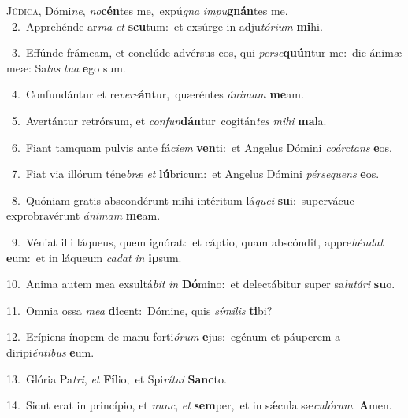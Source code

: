 \lettrine{\initial\textcolor{\initialcolor}{J}}{údica,} Dómi\-\textit{ne}\-, \textit{no}\-\textbf{cén}tes me,~\star expú\textit{gna} \textit{im}\-\textit{pu}\textbf{gnán}tes me.\\
{\numbfont\textcolor{\numbcolor}{~2.}}~Apprehénde ar\textit{ma} \textit{et} \textbf{scu}\-tum:~\star et exsúrge in adju\-\textit{tó}\-\textit{ri}\textit{um} \textbf{mi}\-hi.\par
{\numbfont\textcolor{\numbcolor}{~3.}}~Effúnde frámeam, et conclúde advérsus eos, qui \textit{per}\-\textit{se}\textbf{quún}tur me:~\star dic ánimæ meæ: Sa\textit{lus} \textit{tu}\-\textit{a} \textbf{e}\-go sum.\par
{\numbfont\textcolor{\numbcolor}{~4.}}~Confundántur et re\-\textit{ve}\-\textit{re}\textbf{án}tur,~\star quæréntes \textit{á}\-\textit{ni}\textit{mam} \textbf{me}\-am.\par
{\numbfont\textcolor{\numbcolor}{~5.}}~Avertántur retrórsum, et \textit{con}\-\textit{fun}\textbf{dán}tur~\star cogitán\textit{tes} \textit{mi}\-\textit{hi} \textbf{ma}\-la.\par
{\numbfont\textcolor{\numbcolor}{~6.}}~Fiant tamquam pulvis ante fá\-\textit{ci}\-\textit{em} \textbf{ven}\-ti:~\star et Angelus Dómini \textit{co}\-\textit{árc}\textit{tans} \textbf{e}\-os.\par
{\numbfont\textcolor{\numbcolor}{~7.}}~Fiat via illórum téne\textit{bræ} \textit{et} \textbf{lú}\-bricum:~\star et Angelus Dómini \textit{pér}\-\textit{se}\textit{quens} \textbf{e}\-os.\par
{\numbfont\textcolor{\numbcolor}{~8.}}~Quóniam gratis abscondérunt mihi intéritum lá\-\textit{que}\-\textit{i} \textbf{su}\-i:~\star supervácue exprobravérunt \textit{á}\-\textit{ni}\textit{mam} \textbf{me}\-am.\par
{\numbfont\textcolor{\numbcolor}{~9.}}~Véniat illi láqueus, quem ignórat:~\dagger et cáptio, quam abscóndit, appre\-\textit{hén}\-\textit{dat} \textbf{e}\-um:~\star et in láqueum \textit{ca}\-\textit{dat} \textit{in} \textbf{ip}\-sum.\par
{\numbfont\textcolor{\numbcolor}{10.}}~Anima autem mea exsultá\textit{bit} \textit{in} \textbf{Dó}\-mino:~\star et delectábitur super sa\-\textit{lu}\-\textit{tá}\textit{ri} \textbf{su}\-o.\par
{\numbfont\textcolor{\numbcolor}{11.}}~Omnia ossa \textit{me}\-\textit{a} \textbf{di}\-cent:~\star Dómine, quis \textit{sí}\-\textit{mi}\textit{lis} \textbf{ti}\-bi?\par
{\numbfont\textcolor{\numbcolor}{12.}}~Erípiens ínopem de manu forti\-\textit{ó}\-\textit{rum} \textbf{e}\-jus:~\star egénum et páuperem a diripi\-\textit{én}\-\textit{ti}\textit{bus} \textbf{e}\-um.\par
{\numbfont\textcolor{\numbcolor}{13.}}~Glória Pa\-\textit{tri}\-, \textit{et} \textbf{Fí}\-lio,~\star et Spi\-\textit{rí}\-\textit{tu}\textit{i} \textbf{Sanc}\-to.\par
{\numbfont\textcolor{\numbcolor}{14.}}~Sicut erat in princípio, et \textit{nunc}\-, \textit{et} \textbf{sem}\-per,~\star et in sǽcula sæ\-\textit{cu}\-\textit{ló}\textit{rum}. \textbf{A}\-men.\par

